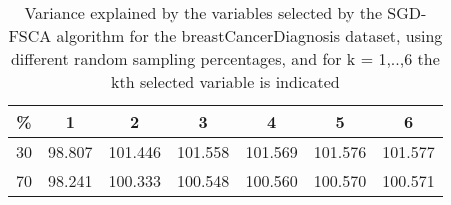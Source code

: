 \begin{table}
	\begin{center}
		\begin{tabular}{c c c c c c c}
			\% & 1 & 2 & 3 & 4 & 5 & 6 \\
			\hline
			30 & 98.807 & 101.446 & 101.558 & 101.569 & 101.576 & 101.577 \\
			70 & 98.241 & 100.333 & 100.548 & 100.560 & 100.570 & 100.571 \\
		\end{tabular}
	\end{center}
	\caption{Variance explained by the variables selected by the SGD-FSCA algorithm for the breastCancerDiagnosis dataset, using different random sampling percentages, and for k = 1,..,6 the kth selected variable is indicated}
\end{table}